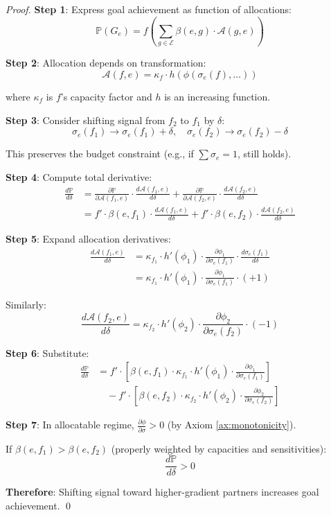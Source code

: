 \documentclass[11pt,a4paper]{article}
\theoremstyle{definition}
\theoremstyle{remark}
\newcommand{\E}{\mathcal{E}}
\newcommand{\A}{\mathcal{A}}
\begin{document}
\begin{proof}
\textbf{Step 1}: Express goal achievement as function of allocations:
\[ \mathbb{P}(G_e) = f\left(\sum_{g \in \E} \beta(e,g) \cdot \A(g,e)\right) \]

\textbf{Step 2}: Allocation depends on transformation:
\[ \A(f,e) = \kappa_f \cdot h(\phi(\sigma_e(f), \ldots)) \]

where $\kappa_f$ is $f$'s capacity factor and $h$ is an increasing function.

\textbf{Step 3}: Consider shifting signal from $f_2$ to $f_1$ by $\delta$:
\[ \sigma_e(f_1) \to \sigma_e(f_1) + \delta, \quad \sigma_e(f_2) \to \sigma_e(f_2) - \delta \]

This preserves the budget constraint (e.g., if $\sum \sigma_e = 1$, still holds).

\textbf{Step 4}: Compute total derivative:
\begin{align*}
\frac{d\mathbb{P}}{d\delta} &= \frac{\partial \mathbb{P}}{\partial \A(f_1,e)} \cdot \frac{d\A(f_1,e)}{d\delta} + \frac{\partial \mathbb{P}}{\partial \A(f_2,e)} \cdot \frac{d\A(f_2,e)}{d\delta} \\
&= f' \cdot \beta(e,f_1) \cdot \frac{d\A(f_1,e)}{d\delta} + f' \cdot \beta(e,f_2) \cdot \frac{d\A(f_2,e)}{d\delta}
\end{align*}

\textbf{Step 5}: Expand allocation derivatives:
\begin{align*}
\frac{d\A(f_1,e)}{d\delta} &= \kappa_{f_1} \cdot h'(\phi_1) \cdot \frac{\partial \phi_1}{\partial \sigma_e(f_1)} \cdot \frac{d\sigma_e(f_1)}{d\delta} \\
&= \kappa_{f_1} \cdot h'(\phi_1) \cdot \frac{\partial \phi_1}{\partial \sigma_e(f_1)} \cdot (+1)
\end{align*}

Similarly:
\[ \frac{d\A(f_2,e)}{d\delta} = \kappa_{f_2} \cdot h'(\phi_2) \cdot \frac{\partial \phi_2}{\partial \sigma_e(f_2)} \cdot (-1) \]

\textbf{Step 6}: Substitute:
\begin{align*}
\frac{d\mathbb{P}}{d\delta} &= f' \cdot \left[\beta(e,f_1) \cdot \kappa_{f_1} \cdot h'(\phi_1) \cdot \frac{\partial \phi_1}{\partial \sigma_e(f_1)}\right] \\
&\quad - f' \cdot \left[\beta(e,f_2) \cdot \kappa_{f_2} \cdot h'(\phi_2) \cdot \frac{\partial \phi_2}{\partial \sigma_e(f_2)}\right]
\end{align*}

\textbf{Step 7}: In allocatable regime, $\frac{\partial \phi}{\partial \sigma} > 0$ (by Axiom \ref{ax:monotonicity}).

If $\beta(e,f_1) > \beta(e,f_2)$ (properly weighted by capacities and sensitivities):
\[ \frac{d\mathbb{P}}{d\delta} > 0 \]

\textbf{Therefore}: Shifting signal toward higher-gradient partners increases goal achievement. \qed
\end{proof}
\end{document}
